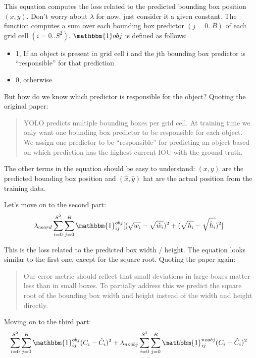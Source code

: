This equation computes the loss related to the predicted bounding box position $(x,y)$. Don’t worry about $\lambda$ for now, just consider it a given constant. The function computes a sum over each bounding box predictor $(j = 0..B)$ of each grid cell $(i = 0 .. S^2)$. $\mathbbm{1} obj$ is defined as follows:

\begin{itemize}
  \item 1, If an object is present in grid cell i and the jth bounding box predictor is “responsible” for that prediction
  \item 0, otherwise
\end{itemize}

But how do we know which predictor is responsible for the object? Quoting the original paper:
\begin{quote}
YOLO predicts multiple bounding boxes per grid cell. At training time we only want one bounding box predictor to be responsible for each object. We assign one predictor to be “responsible” for predicting an object based on which prediction has the highest current IOU with the ground truth.
\end{quote}

The other terms in the equation should be easy to understand: $(x, y)$ are the predicted bounding box position and $(\hat{x}, \hat{y})$ hat are the actual position from the training data.

Let’s move on to the second part:
\begin{equation}
  \lambda_{coord} \sum_{i=0}^{S^2}\sum_{j=0}^B \mathbbm{1}_{ij}^{obj}[(\sqrt{w_i}-\sqrt{\hat{w}_i})^2 +(\sqrt{h_i}-\sqrt{\hat{h}_i})^2 ]
\label{yolo-loss-func-2}
\end{equation}


This is the loss related to the predicted box width / height. The equation looks similar to the first one, except for the square root. Quoting the paper again:

\begin{quote}
Our error metric should reflect that small deviations in large boxes matter less than in small boxes. To partially address this we predict the square root of the bounding box width and height instead of the width and height directly.
  \end{quote}

    

Moving on to the third part:
\begin{equation}
  \sum_{i=0}^{S^2}\sum_{j=0}^B \mathbbm{1}_{ij}^{obj}(C_i - \hat{C}_i)^2 + \lambda_{noobj}\sum_{i=0}^{S^2}\sum_{j=0}^B \mathbbm{1}_{ij}^{noobj}(C_i - \hat{C}_i)^2
\label{yolo-loss-func-3}
\end{equation}


